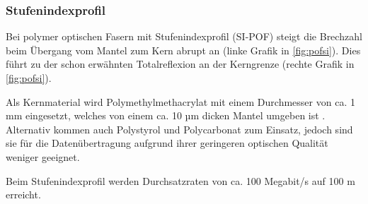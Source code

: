 \subsubsection{Stufenindexprofil}

Bei polymer optischen Fasern mit Stufenindexprofil (SI-POF) steigt die Brechzahl
beim Übergang vom Mantel zum Kern abrupt an (linke Grafik in
\autoref{fig:pofsi}). Dies führt zu der schon erwähnten Totalreflexion an der
Kerngrenze (rechte Grafik in \autoref{fig:pofsi}).

Als Kernmaterial wird Polymethylmethacrylat mit einem Durchmesser von ca. 1 mm
eingesetzt, welches von einem ca. 10 µm dicken Mantel umgeben ist
\cite{pofacsi}. Alternativ kommen auch Polystyrol und Polycarbonat zum Einsatz,
jedoch sind sie für die Datenübertragung aufgrund ihrer geringeren optischen
Qualität weniger geeignet.

Beim Stufenindexprofil werden Durchsatzraten von ca. 100 Megabit/s auf 100 m
erreicht.

